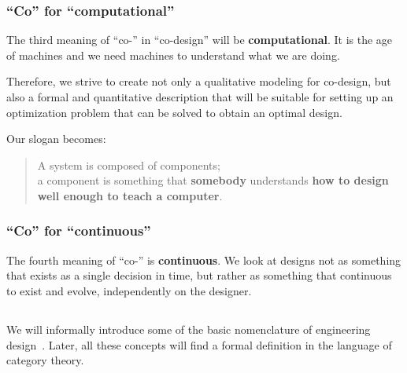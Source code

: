 \subsubsection{``Co'' for ``computational''}

The third meaning of ``co-'' in ``co-design'' will be \textbf{computational}. It is the age of machines and we need
 machines to understand what we are doing. 

Therefore, we strive to create not only a qualitative modeling for co-design, but also a formal and quantitative description that will be suitable for setting up an optimization problem that can be solved to obtain an optimal design.

Our slogan becomes:

\begin{quote}
    A system is composed of components;\\
      a component is something that \textbf{somebody} understands
      \textbf{how to design} \textbf{well enough to teach a computer}.
\end{quote}


\subsubsection{``Co'' for ``continuous''}

The fourth meaning of ``co-'' is \textbf{continuous}. We look at designs not as something that exists
as a single decision in time, but rather as something that continuous to exist and evolve, independently 
on the designer.






\subsection{}

We will informally introduce some of the basic nomenclature of engineering
design~\cite{antonsson2005formal,deweck2011}. Later, all these concepts will find a formal
definition in the language of category theory.

